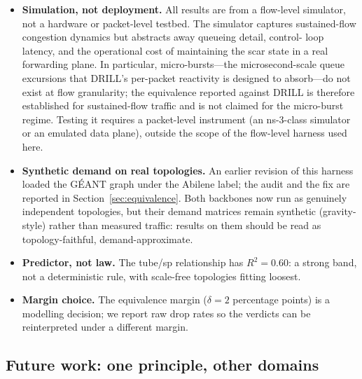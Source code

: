 \begin{itemize}
\item \textbf{Simulation, not deployment.} All results are from a flow-level
simulator, not a hardware or packet-level testbed. The simulator captures
sustained-flow congestion dynamics but abstracts away queueing detail, control-
loop latency, and the operational cost of maintaining the scar state in a real
forwarding plane. In particular, micro-bursts---the microsecond-scale queue excursions that DRILL's per-packet reactivity is designed to absorb---do not exist at flow granularity; the equivalence reported against DRILL is therefore established for sustained-flow traffic and is not claimed for the micro-burst regime. Testing it requires a packet-level instrument (an ns-3-class simulator or an emulated data plane), outside the scope of the flow-level harness used here.
\item \textbf{Synthetic demand on real topologies.} An earlier revision of this harness loaded the G\'EANT graph under the Abilene label; the audit and the fix are reported in Section~\ref{sec:equivalence}. Both backbones now run as genuinely independent topologies, but their demand matrices remain synthetic (gravity-style) rather than measured traffic: results on them should be read as topology-faithful, demand-approximate.
\item \textbf{Predictor, not law.} The tube/sp relationship has $R^2 = 0.60$: a
strong band, not a deterministic rule, with scale-free topologies fitting
loosest.
\item \textbf{Margin choice.} The equivalence margin ($\delta = 2$ percentage
points) is a modelling decision; we report raw drop rates so the verdicts can be
reinterpreted under a different margin.
\end{itemize}

\subsection{Future work: one principle, other domains}

